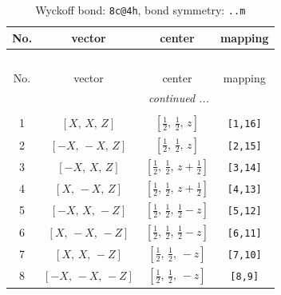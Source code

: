 \documentclass[fleqn,8pt]{jsarticle}
\begin{document}
\renewcommand{\arraystretch}{1.2}
\begin{longtable}{cccc}
\caption{Wyckoff bond: {\tt 8c@4h}, bond symmetry: {\tt ..m}}
 \\
 \hline \hline
No. & vector & center & mapping \\ \hline \endfirsthead

\multicolumn{3}{l}{\tablename\ \thetable{}} \\
 \hline \hline
No. & vector & center & mapping \\ \hline \endhead

 \hline \hline
\multicolumn{3}{r}{\footnotesize\it continued ...} \\ \endfoot

 \hline \hline
\multicolumn{3}{r}{} \\ \endlastfoot

1 & $\left[ X,\, X,\, Z \right]$ & $\left[ \frac{1}{2},\, \frac{1}{2},\, z \right]$ & {\tt [1,16]} \\ \hline
2 & $\left[ - X,\, - X,\, Z \right]$ & $\left[ \frac{1}{2},\, \frac{1}{2},\, z \right]$ & {\tt [2,15]} \\ \hline
3 & $\left[ - X,\, X,\, Z \right]$ & $\left[ \frac{1}{2},\, \frac{1}{2},\, z + \frac{1}{2} \right]$ & {\tt [3,14]} \\ \hline
4 & $\left[ X,\, - X,\, Z \right]$ & $\left[ \frac{1}{2},\, \frac{1}{2},\, z + \frac{1}{2} \right]$ & {\tt [4,13]} \\ \hline
5 & $\left[ - X,\, X,\, - Z \right]$ & $\left[ \frac{1}{2},\, \frac{1}{2},\, \frac{1}{2} - z \right]$ & {\tt [5,12]} \\ \hline
6 & $\left[ X,\, - X,\, - Z \right]$ & $\left[ \frac{1}{2},\, \frac{1}{2},\, \frac{1}{2} - z \right]$ & {\tt [6,11]} \\ \hline
7 & $\left[ X,\, X,\, - Z \right]$ & $\left[ \frac{1}{2},\, \frac{1}{2},\, - z \right]$ & {\tt [7,10]} \\ \hline
8 & $\left[ - X,\, - X,\, - Z \right]$ & $\left[ \frac{1}{2},\, \frac{1}{2},\, - z \right]$ & {\tt [8,9]} \\
\end{longtable}
\renewcommand{\arraystretch}{1.2}
\end{document}
